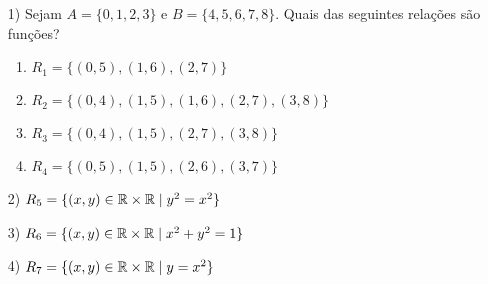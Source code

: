 \documentclass{beamer}
\begin{document}
    \begin{frame}
        \begin{exemplos}
            \begin{enumerate}
                \item[1)] Sejam $A = \{0,1,2,3\}$ \pause e $B = \{4,5,6,7,8\}$. \pause Quais das seguintes rela{\c c}{\~o}es s{\~a}o fun{\c c}{\~o}es?\pause
                \begin{enumerate}[label={\alph*})]
                    \item $R_1 = \{(0,5),(1,6),(2,7)\}$\pause

                    \vspace{1cm}

                    \item $R_2 = \{(0,4),(1,5),(1,6),(2,7),(3,8)\}$\pause

                    \vspace{1cm}

                    \item $R_3 = \{(0,4),(1,5),(2,7),(3,8)\}$\pause

                    \vspace{1cm}

                    \item $R_4 = \{(0,5),(1,5),(2,6),(3,7)\}$\pause

                    \vspace{1cm}
                \end{enumerate}
            \end{enumerate}
        \end{exemplos}
    \end{frame}

    \begin{frame}
        \begin{exemplos}
            \begin{enumerate}
                \item[2)] $R_{5} = \{(x,y) \in \mathbb{R}  \times \mathbb{R}  \mid y^2 = x^2\}$\pause
                
                \vspace{1cm}

                \item[3)] $R_{6} = \{(x,y) \in \mathbb{R}  \times \mathbb{R}  \mid x^2 + y^2 = 1\}$\pause
                
                \vspace{1cm}

                \item[4)] $R_{7} = \{(x,y) \in \mathbb{R}  \times \mathbb{R} \mid y = x^2\}$\pause

                \vspace{1.5cm}
            \end{enumerate} 
        \end{exemplos}
    \end{frame}
\end{document}
